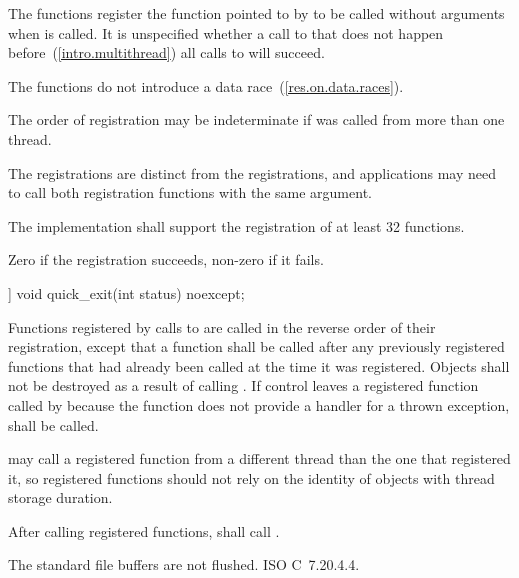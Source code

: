\begin{itemdescr}
\pnum
\effects The  functions register the function pointed to by 
to be called without arguments when  is called.
It is unspecified whether a call to  that does not
happen before~(\ref{intro.multithread}) all calls to  will succeed. \begin{note} The
 functions do not introduce a
data race~(\ref{res.on.data.races}). \end{note}
\begin{note}
The order of registration may be indeterminate if  was called from more
than one thread.
\end{note}
\begin{note} The
 registrations are distinct from the  registrations,
and applications may need to call both registration functions with the same argument.
\end{note}

\pnum
\implimits
The implementation shall support the registration of at least 32 functions.

\pnum
\returns Zero if the registration succeeds, non-zero if it fails.
\end{itemdescr}

\begin{itemdecl}
[[noreturn]] void quick_exit(int status) noexcept;
\end{itemdecl}

\begin{itemdescr}
\pnum
\effects Functions registered by calls to  are called in the
reverse order of their registration, except that a function shall be called after any
previously registered functions that had already been called at the time it was
registered. Objects shall not be destroyed as a result of calling .
If control leaves a registered function called by  because the
function does not provide a handler for a thrown exception,  shall
be called.%
\begin{note}  may call a registered function from a different thread
than the one that registered it, so registered functions should not rely on the identity
of objects with thread storage duration. \end{note}
After calling registered functions,  shall call .
\begin{note} The standard file buffers are not flushed. \xsee ISO C~7.20.4.4. \end{note}

\end{itemdescr}

